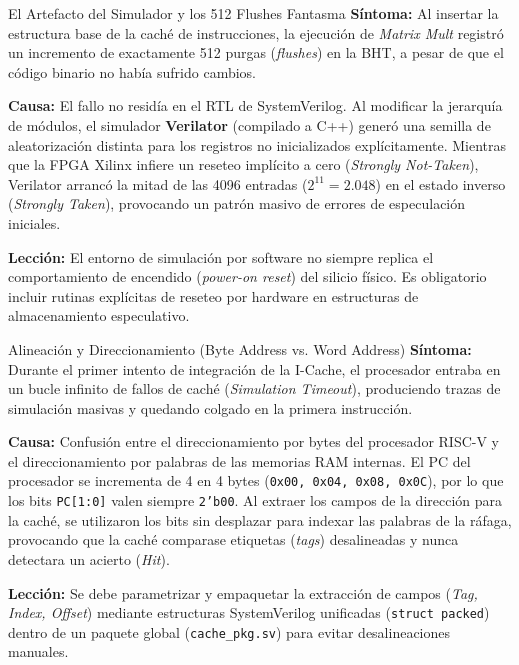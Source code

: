 \documentclass[10pt,a4paper]{article}
\begin{document}
\begin{bugbox}{El Artefacto del Simulador y los 512 Flushes Fantasma}
    \textbf{Síntoma:} Al insertar la estructura base de la caché de instrucciones, la ejecución de \textit{Matrix Mult} registró un incremento de exactamente 512
    purgas (\textit{flushes}) en la BHT, a pesar de que el código binario no había sufrido cambios.

    \textbf{Causa:} El fallo no residía en el RTL de SystemVerilog. Al modificar la jerarquía de módulos, el simulador \textbf{Verilator} \cite{verilator} (compilado a C++)
    generó una semilla de aleatorización distinta para los registros no inicializados explícitamente. Mientras que la FPGA Xilinx infiere un reseteo implícito a
    cero (\textit{Strongly Not-Taken}), Verilator arrancó la mitad de las 4096 entradas ($2^{11} = 2.048$) en el estado inverso (\textit{Strongly Taken}), provocando un
    patrón masivo de errores de especulación iniciales.

    \textbf{Lección:} El entorno de simulación por software no siempre replica el comportamiento de encendido (\textit{power-on reset}) del silicio
    físico. Es obligatorio incluir rutinas explícitas de reseteo por hardware en estructuras de almacenamiento especulativo.
\end{bugbox}

\begin{bugbox}{Alineación y Direccionamiento (Byte Address vs. Word Address)}
    \textbf{Síntoma:} Durante el primer intento de integración de la I-Cache, el procesador entraba en un bucle infinito de fallos de caché 
    (\textit{Simulation Timeout}), produciendo trazas de simulación masivas y quedando colgado en la primera instrucción.

    \textbf{Causa:} Confusión entre el direccionamiento por bytes del procesador RISC-V y el direccionamiento por palabras de las memorias RAM internas. El PC
    del procesador se incrementa de 4 en 4 bytes (\texttt{0x00, 0x04, 0x08, 0x0C}), por lo que los bits \texttt{PC[1:0]} valen siempre \texttt{2'b00}. Al extraer
    los campos de la dirección para la caché, se utilizaron los bits sin desplazar para indexar las palabras de la ráfaga, provocando que la caché comparase etiquetas
    (\textit{tags}) desalineadas y nunca detectara un acierto (\textit{Hit}).

    \textbf{Lección:} Se debe parametrizar y empaquetar la extracción de campos (\textit{Tag, Index, Offset}) mediante estructuras SystemVerilog
    unificadas (\texttt{struct packed}) dentro de un paquete global (\texttt{cache\_pkg.sv}) para evitar desalineaciones manuales.
\end{bugbox}
\end{document}
